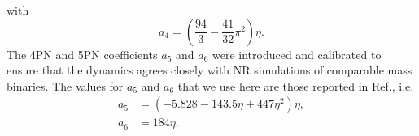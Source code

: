\documentclass[aps,
prd,
amsmath,
amssymb,
twocolumn,
floatfix,
groupedaddress]{revtex4-1}
\begin{document}
with
\begin{equation}\label{metric_a4}
a_4 = \left(\dfrac{94}{3} - \dfrac{41}{32}\pi^2\right)\eta.
\end{equation}
The 4PN and 5PN coefficients $a_5$ and $a_6$ were introduced and calibrated \citep{EOBNRdevel01,EOBNRdevel02,EOBNRdevel03,EOBNRdevel04} to ensure that the dynamics agrees closely with NR simulations of comparable mass binaries. The values for $a_5$ and $a_6$ that we use here are those reported in Ref.\citep{BuonannoEOBv2Main}, i.e.
\begin{subequations}\label{metric_tunable_coeffs}
\begin{align}
a_5 &= \left(-5.828 - 143.5\eta + 447\eta^2\right)\eta ,\\
a_6 &= 184\eta .
\end{align}
\end{subequations}
\end{document}
